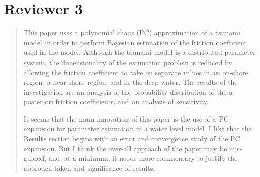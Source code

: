 \documentclass[]{article}
\begin{document}
\section*{Reviewer 3}
\begin{quote}
This paper uses a polynomial chaos (PC) approximation of a tsunami model in order to perform Bayesian estimation of the friction coefficient used in the model. Although the tsunami model is a distributed parameter system, the dimensionality of the estimation problem is reduced by allowing the friction coefficient to take on separate values in an on-shore region, a near-shore region, and in the deep water. The results of the investigation are an analysis of the probability distribution of the a posteriori friction coefficients, and an analysis of sensitivity.

It seems that the main innovation of this paper is the use of a PC expansion for parameter estimation in a water level model. I like that the Results section begins with an error and convergence study of the PC expansion. But I think the over-all approach of the paper may be mis-guided, and, at a minimum, it needs more commentary to justify the approach taken and significance of results.
\end{quote}
\end{document}
